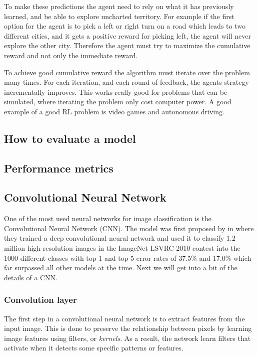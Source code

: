 \documentclass[thesis.tex]{subfiles}
\begin{document}
To make these predictions the agent need to rely on what it has previously learned, and be able to explore uncharted territory. For example if the first option for the agent is to pick a left or right turn on a road which leads to two different cities, and it gets a positive reward for picking left, the agent will never explore the other city. Therefore the agent must try to maximize the cumulative reward and not only the immediate reward.

To achieve good cumulative reward the algorithm must iterate over the problem many times. For each iteration, and each round of feedback, the agents strategy incrementally improves. This works really good for problems that can be simulated, where iterating the problem only cost computer power. A good example of a good RL problem is video games and autonomous driving.


\subsection{How to evaluate a model}

\subsection{Performance metrics}

\subsection{Convolutional Neural Network} \label{convolutional_neural_network}
One of the most used neural networks for image classification is the Convolutional Neural Network (CNN). The model was first proposed by \citeauthor*{ImageNetClassification12} in \citeyear{ImageNetClassification12} \cite{ImageNetClassification12} where they trained a deep convolutional neural network and used it to classify 1.2 million high-resolution images in the ImageNet LSVRC-2010 contest into the 1000 different classes with top-1 and top-5 error rates of 37.5\% and 17.0\% which far surpassed all other models at the time. Next we will get into a bit of the details of a CNN.


\subsubsection{Convolution layer}
The first step in a convolutional neural network is to extract features from the input image. This is done to preserve the relationship between pixels by learning image features using filters, or \textit{kernels}. As a result, the network learn filters that activate when it detects some specific patterns or features.
\end{document}
